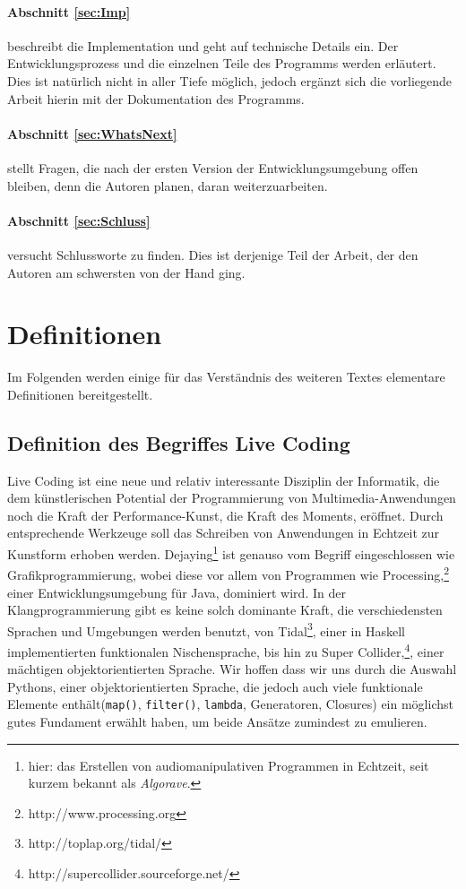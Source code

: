 \paragraph{Abschnitt \ref{sec:Imp}}
	beschreibt die Implementation und geht auf technische Details ein. Der Entwicklungsprozess und die einzelnen Teile des Programms werden 
	erläutert. Dies ist natürlich nicht in aller Tiefe möglich, jedoch ergänzt sich die vorliegende Arbeit hierin mit der Dokumentation des 
    Programms.
\paragraph{Abschnitt \ref{sec:WhatsNext}}
	stellt Fragen, die nach der ersten Version der Entwicklungsumgebung offen bleiben, denn die Autoren planen, daran weiterzuarbeiten.
\paragraph{Abschnitt \ref{sec:Schluss}}
	versucht Schlussworte zu finden. Dies ist derjenige Teil der Arbeit, der den Autoren am schwersten von der Hand ging.

\newpage

\section{Definitionen} \label{sec:Def}
	Im Folgenden werden einige für das Verständnis des weiteren Textes elementare Definitionen bereitgestellt.

\subsection{Definition des Begriffes Live Coding} \label{sec:LiveCoding}
	Live Coding ist eine neue und relativ interessante Disziplin der Informatik, die dem künstlerischen Potential der Programmierung von
	Multimedia-Anwendung\-en noch die Kraft der Performance-Kunst, die Kraft des Moments, eröffnet. Durch entsprechende Werkzeuge soll das 
	Schreiben von Anwendungen in Echtzeit zur Kunstform erhoben werden. Dejaying\footnote{hier: das Erstellen von audiomanipulativen Programmen 
	in Echtzeit, seit kurzem bekannt als \textit{Algorave}.} ist genauso vom Begriff eingeschlossen wie Grafikprogrammierung, wobei diese vor allem von 
	Programmen wie Processing,\footnote{http://www.processing.org} einer Entwicklungsumgebung für Java, dominiert wird. In der Klangprogrammierung
	gibt es keine solch dominante Kraft, die verschiedensten Sprachen und Umgebungen werden benutzt, von Tidal\footnote{http://toplap.org/tidal/}, einer
	in Haskell implementierten funktionalen Nischensprache, bis hin zu Super Collider,\footnote{http://supercollider.sourceforge.net/}, einer mächtigen 
    objektorientierten Sprache. Wir hoffen dass wir uns durch die Auswahl Pythons, einer objektorientierten Sprache, die jedoch auch viele funktionale
    Elemente enthält(\texttt{map()}, \texttt{filter()}, \texttt{lambda}, Generatoren, Closures) ein möglichst gutes Fundament erwählt haben, um beide Ansätze 
    zumindest zu emulieren.
